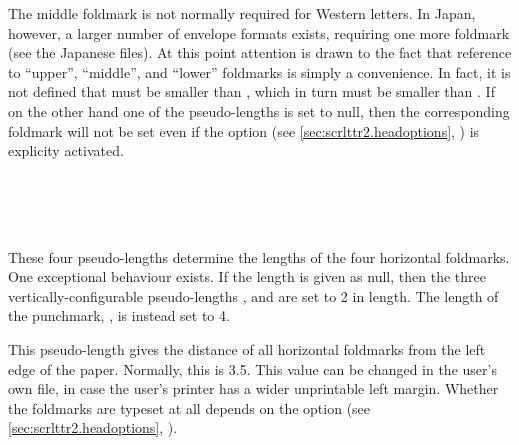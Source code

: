 The middle foldmark is not normally required for Western letters. In
Japan, however, a larger number of envelope formats exists, requiring
one more foldmark (see the Japanese  files). At this point
attention is drawn to the fact that reference to ``upper'',
``middle'', and ``lower'' foldmarks is simply a convenience. In fact,
it is not defined that  must be smaller than
, which in turn must be smaller than
. If on the other hand one of the
pseudo-lengths is set to null, then the corresponding foldmark will
not be set even if the option  (see
\autoref{sec:scrlttr2.headoptions},
) is explicity activated.
%
%
%
%


\begin{Declaration}
  \\
  \\
  \\
\end{Declaration}
%
%
%
%
These four pseudo-lengths
determine the lengths of the four horizontal foldmarks. One
exceptional behaviour exists. If the length is given as null, then the
three vertically-configurable pseudo-lengths
,  and
 are set to 2 in length. The length of
the punchmark, , is instead set to 4.
%
%
%
%


\begin{Declaration}
\end{Declaration}
%
This pseudo-length gives the distance of all horizontal foldmarks from
the left edge of the paper. Normally, this is 3.5. This value
can be changed in the user's own  file, in case the user's
printer has a wider unprintable left margin. Whether the foldmarks are
typeset at all depends on the option  (see
\autoref{sec:scrlttr2.headoptions},
).
%
%
%


